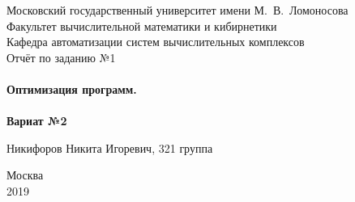 \documentclass[a4peper, 12pt, titlepage, finall]{extreport}
\begin{document}
    \begin{titlepage}
        \begin{center}
            {\small \sc Московский государственный университет имени М.~В.~Ломоносова\\
            Факультет вычислительной математики и кибирнетики\\
            Кафедра автоматизации систем вычислительных комплексов\\}
            \vfill
            {\large \sc Отчёт по заданию №1}\\~\\

            {\large \bf Оптимизация программ.}\\~\\

            {\large \bf Вариат №2}
        \end{center}
        
        \begin{flushright}
            \vfill
            {Никифоров Никита Игоревич, 321 группа}
        \end{flushright}

        \begin{center}
            \vfill
            {\small Москва\\2019}
        \end{center}
    \end{titlepage}
\end{document}
